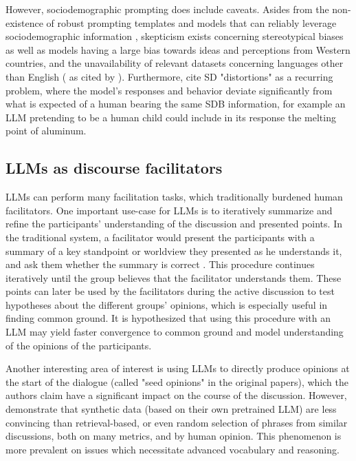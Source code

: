 However, sociodemographic prompting does include caveats. Asides from the non-existence of robust prompting templates and models that can reliably leverage sociodemographic information \cite{beck-etal-2024-sensitivity}, skepticism exists concerning stereotypical biases \cite{cheng-etal-2023-marked, deshpande-etal-2023-toxicity} as well as models having a large bias towards ideas and perceptions from Western countries, and the unavailability of relevant datasets concerning languages other than English (\cite{pmlr-v202-santurkar23a, durmus2024measuringrepresentationsubjectiveglobal, santy-etal-2023-nlpositionality} as cited by \citet{beck-etal-2024-sensitivity}). Furthermore, \citet{aher2023usinglargelanguagemodels} cite SD "distortions" as a recurring problem, where the model's responses and behavior deviate significantly from what is expected of a human bearing the same \ac{SDB} information, for example an LLM pretending to be a human child could include in its response the melting point of aluminum.


\subsection{LLMs as discourse facilitators}
\label{sec:related:discource}


LLMs can perform many facilitation tasks, which traditionally burdened human facilitators. One important use-case for LLMs is to iteratively summarize and refine the participants' understanding of the discussion and presented points. In the traditional system, a facilitator would present the participants with a summary of a key standpoint or worldview they presented as he understands it, and ask them whether the summary is correct \cite{small-polis-llm, Tsai2024Generative}. This procedure continues iteratively until the group believes that the facilitator understands them. These points can later be used by the facilitators during the active discussion to test hypotheses about the different groups' opinions, which is especially useful in finding common ground. It is hypothesized that using this procedure with an LLM may yield faster convergence to common ground and model understanding of the opinions of the participants. 

Another interesting area of interest is using LLMs to directly produce opinions \cite{small-polis-llm} at the start of the dialogue (called "seed opinions" in the original papers), which the authors claim have a significant impact on the course of the discussion. However, \citet{karadzhov2023delidata} demonstrate that synthetic data (based on their own pretrained LLM) are less convincing than retrieval-based, or even random selection of phrases from similar discussions, both on many metrics, and by human opinion. This phenomenon is more prevalent on issues which necessitate advanced vocabulary and reasoning.

